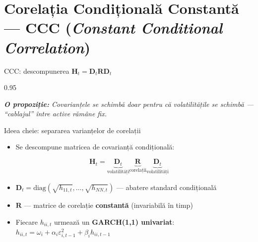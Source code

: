 \documentclass[9pt, aspectratio=169, t]{beamer}
\begin{document}
\section{Corelația Condițională Constantă --- CCC (\textit{Constant Conditional Correlation})}

\begin{frame}{CCC: descompunerea $\mathbf{H}_t = \mathbf{D}_t \mathbf{R} \mathbf{D}_t$}
    \begin{cminipage}{0.95\textwidth}
    {\footnotesize
    \textit{\textbf{O propoziție:} Covarianțele se schimbă doar pentru că volatilitățile se schimbă --- ``cablajul'' între active rămâne fix.}
    \vspace{0.2cm}
    \begin{block}{Ideea cheie: separarea varianțelor de corelații}
        \begin{itemize}\setlength{\itemsep}{0pt}
            \item Se descompune matricea de covarianță condițională:
        \end{itemize}
        \[
            \mathbf{H}_t = \underbrace{\mathbf{D}_t}_{\text{volatilități}} \underbrace{\mathbf{R}}_{\text{corelații}} \underbrace{\mathbf{D}_t}_{\text{volatilități}}
        \]
        \begin{itemize}\setlength{\itemsep}{0pt}
            \item $\mathbf{D}_t = \text{diag}(\sqrt{h_{11,t}}, \ldots, \sqrt{h_{NN,t}})$ --- abatere standard condițională
            \item $\mathbf{R}$ --- matrice de corelație \textbf{constantă} (invariabilă în timp)
            \item Fiecare $h_{ii,t}$ urmează un \textbf{GARCH(1,1) univariat}:
                $h_{ii,t} = \omega_i + \alpha_i \varepsilon_{i,t-1}^2 + \beta_i h_{ii,t-1}$
        \end{itemize}
    \end{block}
    }
    \end{cminipage}
\end{frame}
\end{document}
